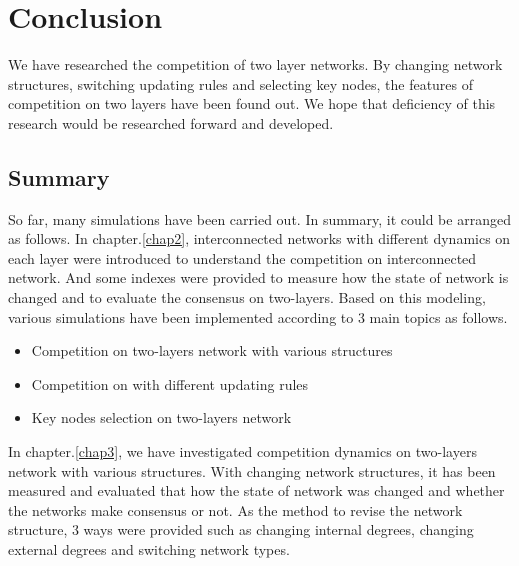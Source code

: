 
\chapter{Conclusion}
\label{chap6}
We have researched the competition of two layer networks. By changing network structures, switching updating rules and selecting key nodes, the features of competition on two layers have been found out. We hope that deficiency of this research would be researched forward and developed. 
\section{Summary}
So far, many simulations have been carried out. In summary, it could be arranged as follows. 
In chapter.\ref{chap2}, interconnected networks with different dynamics on each layer were introduced to understand the competition on interconnected network.  And some indexes were provided to measure how the state of network is changed and to evaluate the consensus on two-layers. Based on this modeling, various simulations have been implemented according to 3 main topics as follows.
\begin{itemize}
\item Competition on two-layers network with various structures
\item Competition on with different updating rules
\item Key nodes selection on two-layers network
\end{itemize}
In chapter.\ref{chap3}, we have investigated competition dynamics on two-layers network with various structures. With changing network structures, it has been measured and evaluated that how the state of network was changed and whether the networks make consensus or not. As the method to revise the network structure, 3 ways were provided such as changing internal degrees, changing external degrees and switching network types. 
